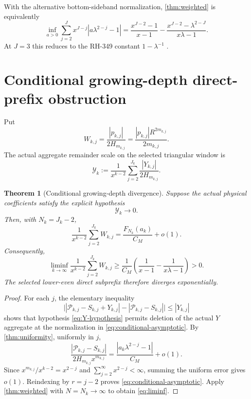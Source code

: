 \documentclass[11pt]{article}
\newtheorem{theorem}{Theorem}[section]
\theoremstyle{remark}
\newcommand{\cP}{\mathcal P}
\newcommand{\cY}{\mathcal Y}
\begin{document}
With the alternative bottom-sideband normalization, \cref{thm:weighted}
is equivalently
\[
 \inf_{a>0}\sum_{j=2}^{J}x^{J-j}|a\lambda^{2-j}-1|
 =\frac{x^{J-2}-1}{x-1}
  -\frac{x^{J-2}-\lambda^{2-J}}{x\lambda-1}.
\]
At $J=3$ this reduces to the RH-349 constant $1-\lambda^{-1}$
\citep{WangTwoSidebands2026}.

\section{Conditional growing-depth direct-prefix obstruction}

Put
\begin{equation}\label{eq:W}
 W_{k,j}=\frac{|p_{k,j}|}{2H_{m_{k,j}}}
 =\frac{|p_{k,j}|R^{2m_{k,j}}}{2m_{k,j}}.
\end{equation}
The actual aggregate remainder scale on the selected triangular window is
\begin{equation}\label{eq:Y-aggregate}
 \cY_k
 :=\frac1{x^{k-2}}
 \sum_{j=2}^{J_k}\frac{|Y_{k,j}|}{2H_{m_{k,j}}}.
\end{equation}

\begin{theorem}[Conditional growing-depth divergence]
\label{thm:conditional}
Suppose the actual physical coefficients satisfy the explicit hypothesis
\begin{equation}\label{eq:Y-hypothesis}
 \boxed{\cY_k\longrightarrow0.}
\end{equation}
Then, with $N_k=J_k-2$,
\begin{equation}\label{eq:conditional-asymptotic}
 \boxed{
 \frac1{x^{k-2}}\sum_{j=2}^{J_k}W_{k,j}
 =\frac{F_{N_k}(a_k)}{C_M}+o(1).}
\end{equation}
Consequently,
\begin{equation}\label{eq:liminf}
 \boxed{
 \liminf_{k\to\infty}
 \frac1{x^{k-2}}\sum_{j=2}^{J_k}W_{k,j}
 \ge\frac1{C_M}
 \left(\frac1{x-1}-\frac1{x\lambda-1}\right)>0.}
\end{equation}
The selected lower-even direct subprefix therefore diverges exponentially.
\end{theorem}

\begin{proof}
For each $j$, the elementary inequality
\[
 \bigl||\cP_{k,j}-S_{k,j}+Y_{k,j}|
       -|\cP_{k,j}-S_{k,j}|\bigr|
 \le |Y_{k,j}|
\]
shows that hypothesis \eqref{eq:Y-hypothesis} permits deletion of the
actual $Y$ aggregate at the normalization in
\eqref{eq:conditional-asymptotic}.  By \cref{thm:uniformity}, uniformly in
$j$,
\[
 \frac{|\cP_{k,j}-S_{k,j}|}{2H_{m_{k,j}}x^{m_{k,j}}}
 =\frac{|a_k\lambda^{2-j}-1|}{C_M}+o(1).
\]
Since $x^{m_{k,j}}/x^{k-2}=x^{2-j}$ and
$\sum_{j=2}^{\infty}x^{2-j}<\infty$, summing the uniform error gives
$o(1)$.  Reindexing by $r=j-2$ proves
\eqref{eq:conditional-asymptotic}.  Apply \cref{thm:weighted} with
$N=N_k\to\infty$ to obtain \eqref{eq:liminf}.
\end{proof}
\end{document}
